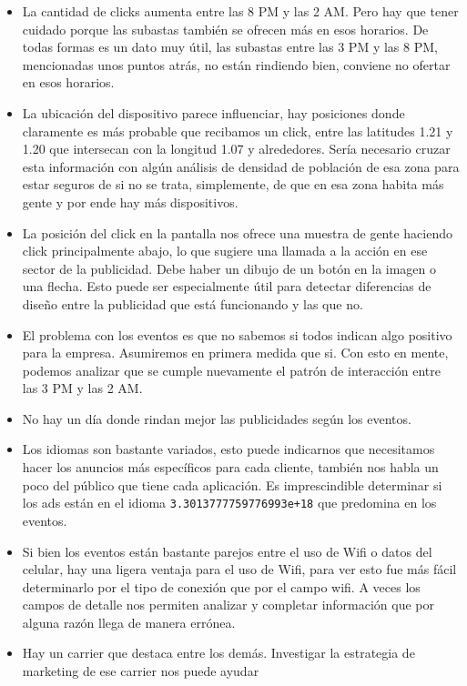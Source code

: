 \documentclass[a4paper, 12pt]{article}
\begin{document}
{{\begin{itemize}
    es un problema de compatibilidad de las apps que se ofrecen y su disponibilidad en el otro SO.
    \item La cantidad de clicks aumenta entre las 8 PM y las 2 AM. Pero hay que tener cuidado porque las subastas también se
    ofrecen más en esos horarios. De todas formas es un dato muy útil, las subastas entre las 3 PM y las 8 PM, mencionadas
    unos puntos atrás, no están rindiendo bien, conviene no ofertar en esos horarios.
    \item La ubicación del dispositivo parece influenciar, hay posiciones donde claramente es más probable que recibamos un click,
    entre las latitudes 1.21 y 1.20 que intersecan con la longitud 1.07 y alrededores. Sería necesario cruzar esta información
    con algún análisis de densidad de población de esa zona para estar seguros de si no se trata, simplemente, de que en esa zona
    habita más gente y por ende hay más dispositivos.
    \item La posición del click en la pantalla nos ofrece una muestra de gente haciendo click principalmente abajo, lo que
    sugiere una llamada a la acción en ese sector de la publicidad. Debe haber un dibujo de un botón en la imagen o una flecha.
    Esto puede ser especialmente útil para detectar diferencias de diseño entre la publicidad que está funcionando y las que no.
    \item El problema con los eventos es que no sabemos si todos indican algo positivo para la empresa. Asumiremos en primera
    medida que si. Con esto en mente, podemos analizar que se cumple nuevamente el patrón de interacción entre las 3 PM y las
    2 AM.
    \item No hay un día donde rindan mejor las publicidades según los eventos.
    \item Los idiomas son bastante variados, esto puede indicarnos que necesitamos hacer los anuncios más específicos para
    cada cliente, también nos habla un poco del público que tiene cada aplicación. Es imprescindible determinar si los ads
    están en el idioma \texttt{3.3013777759776993e+18} que predomina en los eventos.
    \item Si bien los eventos están bastante parejos entre el uso de Wifi o datos del celular, hay una ligera ventaja para
    el uso de Wifi, para ver esto fue más fácil determinarlo por el tipo de conexión que por el campo wifi. A veces los campos
    de detalle nos permiten analizar y completar información que por alguna razón llega de manera errónea.
    \item Hay un carrier que destaca entre los demás. Investigar la estrategia de marketing de ese carrier nos puede ayudar

\end{itemize}}}
\end{document}

